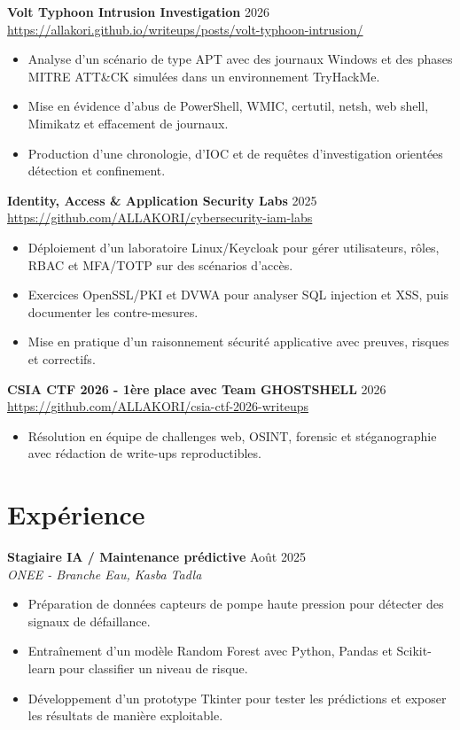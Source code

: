 \documentclass[10pt,a4paper]{article}
\newcommand{\role}[3]{%
  \textbf{#1} \hfill #3\\
  \textit{#2}\vspace{1pt}
}
\begin{document}
\textbf{Volt Typhoon Intrusion Investigation} \hfill 2026\\
\href{https://allakori.github.io/writeups/posts/volt-typhoon-intrusion/}{https://allakori.github.io/writeups/posts/volt-typhoon-intrusion/}
\begin{itemize}
  \item Analyse d'un scénario de type APT avec des journaux Windows et des phases MITRE ATT\&CK simulées dans un environnement TryHackMe.
  \item Mise en évidence d'abus de PowerShell, WMIC, certutil, netsh, web shell, Mimikatz et effacement de journaux.
  \item Production d'une chronologie, d'IOC et de requêtes d'investigation orientées détection et confinement.
\end{itemize}

\textbf{Identity, Access \& Application Security Labs} \hfill 2025\\
\href{https://github.com/ALLAKORI/cybersecurity-iam-labs}{https://github.com/ALLAKORI/cybersecurity-iam-labs}
\begin{itemize}
  \item Déploiement d'un laboratoire Linux/Keycloak pour gérer utilisateurs, rôles, RBAC et MFA/TOTP sur des scénarios d'accès.
  \item Exercices OpenSSL/PKI et DVWA pour analyser SQL injection et XSS, puis documenter les contre-mesures.
  \item Mise en pratique d'un raisonnement sécurité applicative avec preuves, risques et correctifs.
\end{itemize}

\textbf{CSIA CTF 2026 - 1ère place avec Team GHOSTSHELL} \hfill 2026\\
\href{https://github.com/ALLAKORI/csia-ctf-2026-writeups}{https://github.com/ALLAKORI/csia-ctf-2026-writeups}
\begin{itemize}
  \item Résolution en équipe de challenges web, OSINT, forensic et stéganographie avec rédaction de write-ups reproductibles.
\end{itemize}

\section{Expérience}
\role{Stagiaire IA / Maintenance prédictive}{ONEE - Branche Eau, Kasba Tadla}{Août 2025}
\begin{itemize}
  \item Préparation de données capteurs de pompe haute pression pour détecter des signaux de défaillance.
  \item Entraînement d'un modèle Random Forest avec Python, Pandas et Scikit-learn pour classifier un niveau de risque.
  \item Développement d'un prototype Tkinter pour tester les prédictions et exposer les résultats de manière exploitable.
\end{itemize}
\end{document}
